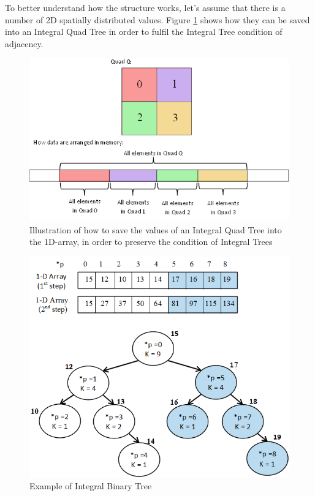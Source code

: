 \documentclass{subfiles}
\begin{document}
\par To better understand how the structure works, let’s assume that there is a number of 2D spatially distributed values. Figure  \ref{fig:IntegralTreeQuads} shows how they can be saved into an Integral Quad Tree in order to fulfil the Integral Tree condition of adjacency. 

\begin{figure}[!htbp]
	\centering
	\includegraphics[width=5.4in]{img/IntegralTree}
	\caption{Illustration of how to save the values of an Integral Quad Tree into the 1D-array, in order to preserve the condition of Integral Trees}
	\label{fig:IntegralTreeQuads}
\end{figure}

\begin{figure}[!htbp]
	\centering
	\includegraphics[width=4.8in]{img/IntegralBinaryTree}
	\caption{Example of Integral Binary Tree}
	\label{fig:IntegralBinaryTree}
\end{figure}
\end{document}
